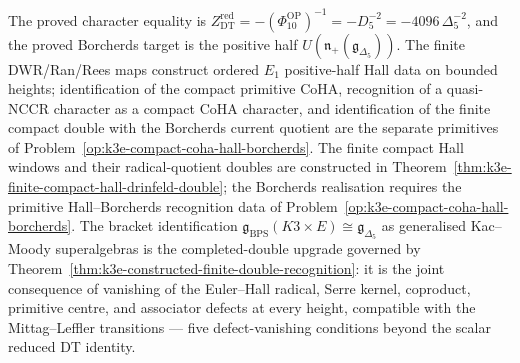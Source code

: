 \begin{remark}
\label{rem:k3e-four-corner-scope}
The proved character equality is
$Z^{\mathrm{red}}_{\mathrm{DT}}
=-(\Phi_{10}^{\mathrm{OP}})^{-1}
=-D_5^{-2}
=-4096\,\Delta_5^{-2}$, and the proved
Borcherds target is the positive half
\(U(\mathfrak n_+(\mathfrak g_{\Delta_5}))\). The finite DWR/Ran/Rees
maps construct ordered \(E_1\) positive-half Hall data on bounded
heights; identification of the compact primitive CoHA, recognition of
a quasi-NCCR character as a compact CoHA character, and identification
of the finite compact double with the Borcherds current quotient are
the separate primitives of
Problem~\ref{op:k3e-compact-coha-hall-borcherds}. The finite compact
Hall windows and their radical-quotient doubles are constructed in
Theorem~\ref{thm:k3e-finite-compact-hall-drinfeld-double}; the
Borcherds realisation requires the primitive Hall--Borcherds
recognition data of Problem~\ref{op:k3e-compact-coha-hall-borcherds}.
The bracket
identification
$\mathfrak{g}_{\mathrm{BPS}}(K3 \times E) \cong \mathfrak{g}_{\Delta_5}$
as generalised Kac--Moody superalgebras is the completed-double
upgrade governed by
Theorem~\ref{thm:k3e-constructed-finite-double-recognition}: it is
the joint consequence of vanishing of the Euler--Hall radical, Serre
kernel, coproduct, primitive centre, and associator defects at every
height, compatible with the Mittag--Leffler transitions — five
defect-vanishing conditions beyond the scalar reduced DT identity.
\end{remark}

